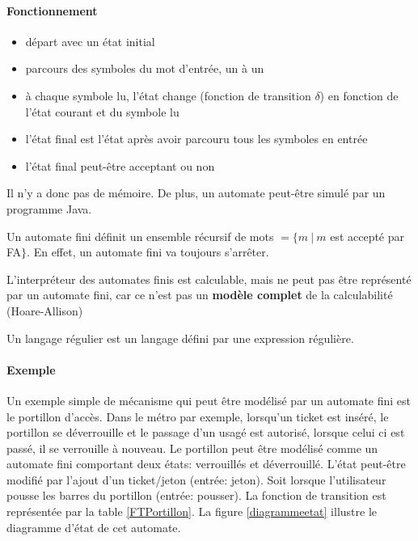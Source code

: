 \paragraph{Fonctionnement}
\begin{itemize}
	\item départ avec un état initial
	\item parcours des symboles du mot d'entrée, un à un
	\item à chaque symbole lu, l'état change (fonction de transition
		$\delta$) en fonction de l'état courant et du symbole lu
	\item l'état final est l'état après avoir parcouru tous les symboles en
		entrée
	\item l'état final peut-être acceptant ou non
\end{itemize}

\begin{myrem}
	Il n'y a donc pas de mémoire. De plus, un automate peut-être simulé
	par un programme Java.
\end{myrem}

\begin{myprop}
	Un automate fini définit un ensemble récursif de mots $=\{m \ |\ m$ est
		accepté par FA$\}$. En effet, un automate fini va toujours s'arrêter.
\end{myprop}

\begin{myprop}
	L'interpréteur des automates finis est calculable, mais ne peut pas être
	représenté par un automate fini, car ce n'est pas un \textbf{modèle
	complet} de la calculabilité (Hoare-Allison)
\end{myprop}

\begin{mydef} Un langage régulier est un langage défini par une expression
	régulière.
\end{mydef}

\paragraph{Exemple}
Un exemple simple de mécanisme qui peut être modélisé par un automate fini est le portillon d'accès. Dans le métro par exemple, lorsqu'un ticket est inséré, le portillon se déverrouille et le passage d'un usagé est autorisé, lorsque celui ci est passé, il se verrouille à nouveau. Le portillon peut être modélisé comme un automate fini comportant deux états: verrouillés et déverrouillé. L'état peut-être modifié par l'ajout d'un ticket/jeton (entrée: jeton). Soit lorsque l'utilisateur pousse les barres du portillon (entrée: pousser). La fonction de transition est représentée par la table \ref{FTPortillon}. La figure \ref{diagrammeetat} illustre le diagramme d'état de cet automate.

